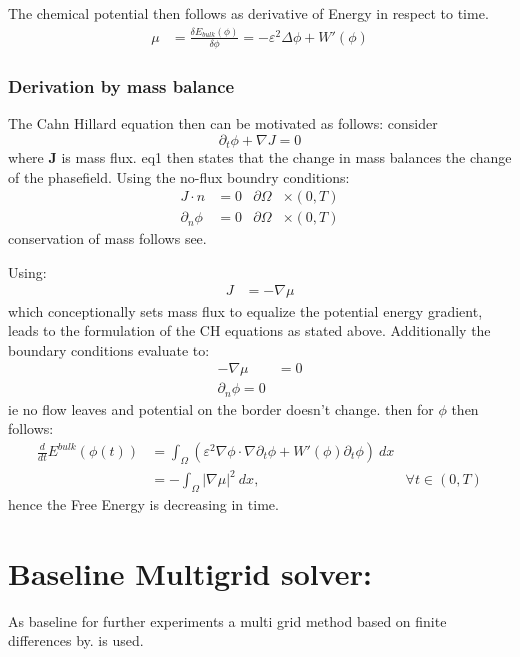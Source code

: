 \documentclass[11pt]{article}
\begin{document}
The chemical potential then follows as derivative of Energy in respect to time.
\begin{align*}
 \mu &= \frac{\delta E_{bulk}(\phi)}{\delta \phi } = -\varepsilon^2 \Delta \phi  + W'(\phi)
\end{align*}
\subsubsection{Derivation by mass balance}
\label{sec:orge9debbd}
The Cahn Hillard equation then can be motivated as follows:
consider
\begin{equation}
    \partial_t \phi + \nabla J  = 0
\end{equation}
where   \textbf{J} is mass flux. eq1 then states that the change in mass balances the change of the phasefield.
Using the no-flux boundry conditions:
\begin{align}
J \cdot n &= 0  & \partial\Omega &\times (0,T)\\
\partial_n\phi  &= 0  & \partial\Omega &\times (0,T)
\end{align}
conservation of mass follows see\autocite{Wu_2022}.

Using:
\begin{align}
J &= - \nabla \mu
\end{align}
which conceptionally sets mass flux to equalize the potential energy gradient, leads to the formulation of the CH equations as stated above. Additionally the boundary conditions evaluate to:
\begin{align*}
 - \nabla \mu &= 0 \\
\partial_n \phi  = 0
\end{align*}
ie no flow leaves and potential on the border doesn't change.
then for \(\phi\) then follows:
\begin{align*}
\frac{d}{dt}E^{bulk}(\phi(t)) &= \int_{\Omega} (\varepsilon^2 \nabla \phi \cdot \nabla \partial_t \phi + W'(\phi) \partial_t \phi) \ d x  \\
&= - \int_{  \Omega } |\nabla \mu|^2 \ d x, & \forall t \in  (0,T)
\end{align*}
hence the Free Energy is decreasing in time.
\section{Baseline Multigrid solver:}
\label{sec:orgdbe990a}
As baseline for further experiments a multi grid method based on finite differences by\autocite{SHIN20117441}. is used.
\end{document}
